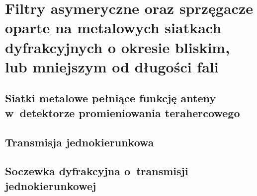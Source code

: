 \chapter{Filtry asymeryczne oraz sprzęgacze oparte na metalowych siatkach dyfrakcyjnych o okresie bliskim, lub mniejszym od długości fali}
\label{chap:thz}


\section{Siatki metalowe pełniące funkcję anteny w~detektorze promieniowania terahercowego}


\section{Transmisja jednokierunkowa}

\section{Soczewka dyfrakcyjna o~transmisji jednokierunkowej}

